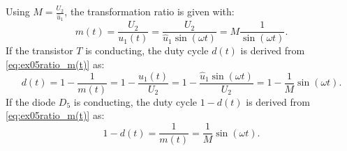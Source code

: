 \begin{solutionblock}
    Using $M = \frac{U_{\mathrm{2}}}{\hat u_{\mathrm{1}}}$, the transformation ratio is given with:
    \begin{equation}
        m(t) = \frac{U_{\mathrm{2}}}{ u_{\mathrm{1}}(t)}=\frac{U_{\mathrm{2}}}{\hat u_{\mathrm{1}} \sin(\omega t)} = M \frac{1}{\sin(\omega t)}.
    \end{equation}
   If the transistor $T$ is conducting, the duty cycle $d(t)$ is derived from \eqref{eq:ex05ratio_m(t)} as:
\begin{equation}
    d(t) = 1-\frac{1}{m(t)} = 1- \frac{u_{\mathrm{1}}(t)}{U_{\mathrm{2}}}=1- \frac{\hat u_{\mathrm{1}}\sin(\omega t)}{U_{\mathrm{2}}} = 1 -\frac{1}{M} \sin(\omega t).
\end{equation}
If the diode $D_{\mathrm{5}}$ is conducting, the duty cycle $1-d(t)$ is derived from \eqref{eq:ex05ratio_m(t)} as:
\begin{equation}
    1-d(t) = \frac{1}{m(t)}=\frac{1}{M} \sin(\omega t).
\end{equation}
\end{solutionblock}

